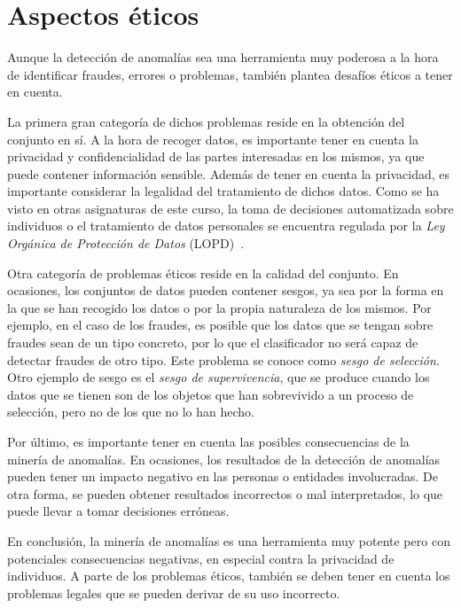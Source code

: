 \section{Aspectos éticos}\label{sec:etica}
Aunque la detección de anomalías sea una herramienta muy poderosa a la hora de identificar
fraudes, errores o problemas, también plantea desafíos éticos a tener en cuenta.

La primera gran categoría de dichos problemas reside en la obtención del conjunto en sí.
A la hora de recoger datos, es importante tener en cuenta la privacidad y confidencialidad
de las partes interesadas en los mismos, ya que puede contener información sensible. Además
de tener en cuenta la privacidad, es importante considerar la legalidad del tratamiento de
dichos datos. Como se ha visto en otras asignaturas de este curso, la toma de decisiones
automatizada sobre individuos o el tratamiento de datos personales se encuentra regulada
por la \textit{Ley Orgánica de Protección de Datos} (LOPD)~\cite{lopd}.

Otra categoría de problemas éticos reside en la calidad del conjunto. En ocasiones, los
conjuntos de datos pueden contener sesgos, ya sea por la forma en la que se han recogido
los datos o por la propia naturaleza de los mismos. Por ejemplo, en el caso de los fraudes,
es posible que los datos que se tengan sobre fraudes sean de un tipo concreto, por lo que
el clasificador no será capaz de detectar fraudes de otro tipo. Este problema se conoce
como \textit{sesgo de selección}. Otro ejemplo de sesgo es el \textit{sesgo de supervivencia},
que se produce cuando los datos que se tienen son de los objetos que han sobrevivido a un
proceso de selección, pero no de los que no lo han hecho.

Por último, es importante tener en cuenta las posibles consecuencias de la minería de
anomalías. En ocasiones, los resultados de la detección de anomalías pueden tener un
impacto negativo en las personas o entidades involucradas. De otra forma, se pueden
obtener resultados incorrectos o mal interpretados, lo que puede llevar a tomar decisiones
erróneas.

En conclusión, la minería de anomalías es una herramienta muy potente pero con potenciales
consecuencias negativas, en especial contra la privacidad de individuos. A parte de los
problemas éticos, también se deben tener en cuenta los problemas legales que se pueden
derivar de su uso incorrecto.
